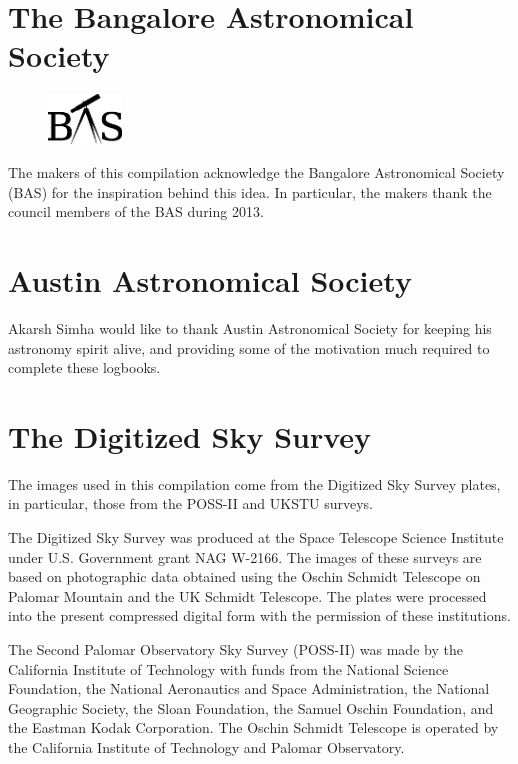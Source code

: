 \section*{The Bangalore Astronomical Society}
\begin{figure}
\vspace{-15pt}
\centering
\includegraphics[width=0.175\textwidth]{BASlogo.eps}
\vspace{-30pt}
\end{figure}
The makers of this compilation acknowledge the Bangalore Astronomical
Society (BAS) for the inspiration behind this idea. In particular, the
makers thank the council members of the BAS during 2013.\\
\vspace{10pt}
\section*{Austin Astronomical Society}
Akarsh Simha would like to thank Austin Astronomical Society for
keeping his astronomy spirit alive, and providing some of the
motivation much required to complete these logbooks.

\section*{The Digitized Sky Survey}
The images used in this compilation come from the Digitized Sky Survey
plates, in particular, those from the POSS-II and UKSTU surveys.

The Digitized Sky Survey was produced at the Space Telescope Science
Institute under U.S. Government grant NAG W-2166. The images of these
surveys are based on photographic data obtained using the Oschin
Schmidt Telescope on Palomar Mountain and the UK Schmidt
Telescope. The plates were processed into the present compressed
digital form with the permission of these institutions.

The Second Palomar Observatory Sky Survey (POSS-II) was made by the
California Institute of Technology with funds from the National
Science Foundation, the National Aeronautics and Space Administration,
the National Geographic Society, the Sloan Foundation, the Samuel
Oschin Foundation, and the Eastman Kodak Corporation. The Oschin
Schmidt Telescope is operated by the California Institute of
Technology and Palomar Observatory.

